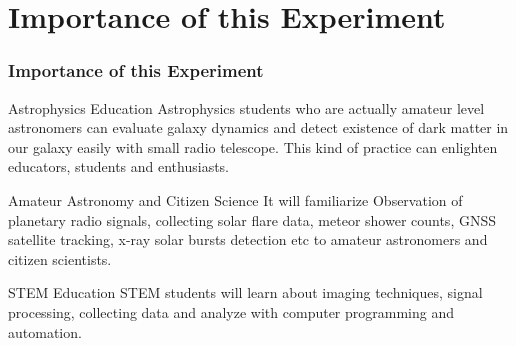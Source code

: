 \documentclass{beamer}
\begin{document}


\section{Importance of this Experiment}


\begin{frame}
\frametitle{Importance of this Experiment}
\begin{block}{Astrophysics Education}
Astrophysics students who are actually amateur level astronomers can evaluate galaxy dynamics and detect existence of dark matter in our galaxy easily with small radio telescope. This kind of practice can enlighten educators, students and enthusiasts.
\end{block}

\begin{block}{Amateur Astronomy and Citizen Science}
It will familiarize Observation of planetary radio signals, collecting solar flare data, meteor shower counts, GNSS satellite tracking, x-ray solar bursts detection etc to amateur astronomers and citizen scientists.
\end{block}

\begin{block}{STEM Education}
STEM students will learn about imaging techniques, signal processing, collecting data and analyze with computer programming and automation.
\end{block}
\end{frame}

\end{document}

